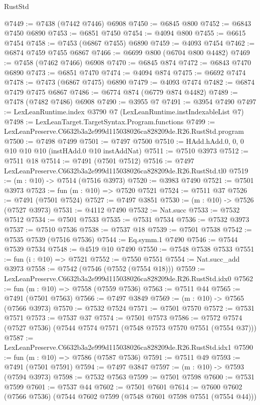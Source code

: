 \begin{lexlean}{RustStd}
\begin{coremodule}
@7449 := @7438 (@7442 @7446) @6908
@7450 := @6845 @800
@7452 := @6843 @7450 @6890
@7453 := @6851 @7450
@7454 := @4094 @800
@7455 := @6615 @7454
@7458 := @7453 (@6867 @7455) @6890
@7459 := @4093 @7454
@7462 := @6874 @7459 @7455 @6867
@7466 := @6699 @800 (@6704 @800 @4482)
@7469 := @7458 (@7462 @7466) @6908
@7470 := @6845 @874
@7472 := @6843 @7470 @6890
@7473 := @6851 @7470
@7474 := @4094 @874
@7475 := @6692 @7474
@7478 := @7473 (@6867 @7475) @6890
@7479 := @4093 @7474
@7482 := @6874 @7479 @7475 @6867
@7486 := @6774 @874 (@6779 @874 @4482)
@7489 := @7478 (@7482 @7486) @6908
@7490 := @3955 @7
@7491 := @3954 @7490
@7497 := LexLeanRuntime.index @3790 @7 (LexLeanRuntime.instIndexableList @7)
@7498 := LexLeanTarget.TargetSyntax.Program.functions
@7499 := LexLeanPreserve.C6632b3a2e999d115038026ca828209de.R26.RustStd.program
@7500 := @7498 @7499
@7501 := @7497 @7500
@7510 := HAdd.hAdd.{0, 0, 0} @10 @10 @10 (instHAdd.{0} @10 instAddNat)
@7511 := @7510 @3973
@7512 := @7511 @18
@7514 := @7491 (@7501 @7512)
@7516 := @7497 LexLeanPreserve.C6632b3a2e999d115038026ca828209de.R26.RustStd.tl0
@7519 := (m : @10) -> @7514 (@7516 @3973)
@7520 := @3983 @7490
@7521 := @7501 @3973
@7523 := fun (m : @10) => @7520 @7521
@7524 := @7511 @37
@7526 := @7491 (@7501 @7524)
@7527 := @7497 @3851
@7530 := (m : @10) -> @7526 (@7527 @3973)
@7531 := @4112 @7490
@7532 := Nat.succ
@7533 := @7532 @7512
@7534 := @7501 @7533
@7535 := @7531 @7534
@7536 := @7532 @3973
@7537 := @7510 @7536
@7538 := @7537 @18
@7539 := @7501 @7538
@7542 := @7535 @7539 (@7516 @7536)
@7544 := Eq.symm.{1} @7490
@7546 := @7544 @7539 @7534
@7548 := @4519 @10 @7490
@7550 := @7548 @7538 @7533
@7551 := fun (i : @10) => @7521
@7552 := @7550 @7551
@7554 := Nat.succ_add @3973
@7558 := @7542 (@7546 (@7552 (@7554 @18)))
@7559 := LexLeanPreserve.C6632b3a2e999d115038026ca828209de.R26.RustStd.idx0
@7562 := fun (m : @10) => @7558 (@7559 @7536)
@7563 := @7511 @44
@7565 := @7491 (@7501 @7563)
@7566 := @7497 @3849
@7569 := (m : @10) -> @7565 (@7566 @3973)
@7570 := @7532 @7524
@7571 := @7501 @7570
@7572 := @7531 @7571
@7573 := @7537 @37
@7574 := @7501 @7573
@7586 := @7572 @7574 (@7527 @7536) (@7544 @7574 @7571 (@7548 @7573 @7570 @7551 (@7554 @37)))
@7587 := LexLeanPreserve.C6632b3a2e999d115038026ca828209de.R26.RustStd.idx1
@7590 := fun (m : @10) => @7586 (@7587 @7536)
@7591 := @7511 @49
@7593 := @7491 (@7501 @7591)
@7594 := @7497 @3847
@7597 := (m : @10) -> @7593 (@7594 @3973)
@7598 := @7532 @7563
@7599 := @7501 @7598
@7600 := @7531 @7599
@7601 := @7537 @44
@7602 := @7501 @7601
@7614 := @7600 @7602 (@7566 @7536) (@7544 @7602 @7599 (@7548 @7601 @7598 @7551 (@7554 @44)))

\end{coremodule}
\end{lexlean}
